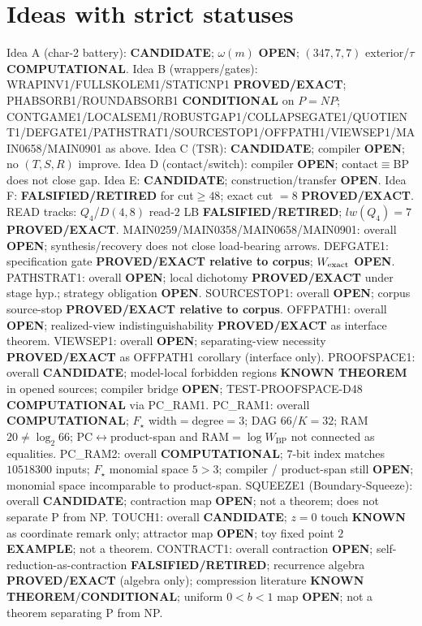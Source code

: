 \documentclass[11pt]{article}
\begin{document}
\section*{Ideas with strict statuses}
Idea A (char-2 battery): \textbf{CANDIDATE}; $\omega(m)$ \textbf{OPEN}; $(347,7,7)$ exterior/$\tau$ \textbf{COMPUTATIONAL}.
Idea B (wrappers/gates): WRAPINV1/FULLSKOLEM1/STATICNP1 \textbf{PROVED/EXACT};
PHABSORB1/ROUNDABSORB1 \textbf{CONDITIONAL} on $P=NP$;
CONTGAME1/LOCALSEM1/ROBUSTGAP1/COLLAPSEGATE1/QUOTIENT1/DEFGATE1/PATHSTRAT1/SOURCESTOP1/OFFPATH1/VIEWSEP1/MAIN0658/MAIN0901 as above.
Idea C (TSR): \textbf{CANDIDATE}; compiler \textbf{OPEN}; no $(T,S,R)$ improve.
Idea D (contact/switch): compiler \textbf{OPEN}; contact$\equiv$BP does not close gap.
Idea E: \textbf{CANDIDATE}; construction/transfer \textbf{OPEN}.
Idea F: \textbf{FALSIFIED/RETIRED} for cut$\ge48$; exact cut $=8$ \textbf{PROVED/EXACT}.
READ tracks: $Q_4$/$D(4,8)$ read-$2$ LB \textbf{FALSIFIED/RETIRED}; $lw(Q_4)=7$ \textbf{PROVED/EXACT}.
MAIN0259/MAIN0358/MAIN0658/MAIN0901: overall \textbf{OPEN}; synthesis/recovery does not close load-bearing arrows.
DEFGATE1: specification gate \textbf{PROVED/EXACT relative to corpus}; $W_{\rm exact}$ \textbf{OPEN}.
PATHSTRAT1: overall \textbf{OPEN}; local dichotomy \textbf{PROVED/EXACT} under stage hyp.; strategy obligation \textbf{OPEN}.
SOURCESTOP1: overall \textbf{OPEN}; corpus source-stop \textbf{PROVED/EXACT relative to corpus}.
OFFPATH1: overall \textbf{OPEN}; realized-view indistinguishability \textbf{PROVED/EXACT} as interface theorem.
VIEWSEP1: overall \textbf{OPEN}; separating-view necessity \textbf{PROVED/EXACT} as OFFPATH1 corollary (interface only).
PROOFSPACE1: overall \textbf{CANDIDATE}; model-local forbidden regions \textbf{KNOWN THEOREM} in opened sources;
compiler bridge \textbf{OPEN}; TEST-PROOFSPACE-D48 \textbf{COMPUTATIONAL} via PC\_RAM1.
PC\_RAM1: overall \textbf{COMPUTATIONAL}; $F_\star$ width$=$degree$=3$; DAG $66$/$K{=}32$; RAM $20\neq\log_2 66$;
PC$\leftrightarrow$product-span and RAM$=\log W_{\mathrm{BP}}$ not connected as equalities.
PC\_RAM2: overall \textbf{COMPUTATIONAL}; $7$-bit index matches $10518300$ inputs; $F_\star$ monomial space $5{\gt}3$;
compiler / product-span still \textbf{OPEN}; monomial space incomparable to product-span.
SQUEEZE1 (Boundary-Squeeze): overall \textbf{CANDIDATE}; contraction map \textbf{OPEN}; not a theorem;
does not separate P from NP.
TOUCH1: overall \textbf{CANDIDATE}; $z{=}0$ touch \textbf{KNOWN} as coordinate remark only; attractor map \textbf{OPEN}; toy fixed point $2$ \textbf{EXAMPLE}; not a theorem.
CONTRACT1: overall contraction \textbf{OPEN}; self-reduction-as-contraction \textbf{FALSIFIED/RETIRED};
recurrence algebra \textbf{PROVED/EXACT} (algebra only); compression literature \textbf{KNOWN THEOREM}/\textbf{CONDITIONAL};
uniform $0{<}b{<}1$ map \textbf{OPEN}; not a theorem separating P from NP.
\end{document}
